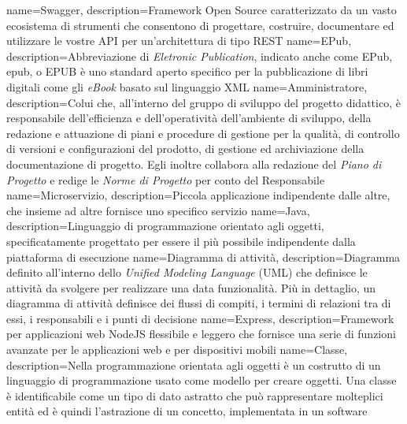  {  
  	name=Swagger,  
  	description={Framework Open Source caratterizzato da un vasto ecosistema di strumenti che consentono di progettare, costruire, documentare ed utilizzare le vostre API per un'architettura di tipo REST}  
}  
 {  
  	name=EPub,   
  	description={Abbreviazione di \textit{Eletronic Publication}, indicato anche come EPub, epub, o EPUB è uno standard aperto specifico per la pubblicazione di libri digitali come gli \textit{eBook} basato sul linguaggio XML}  
}  
 {  
	name=Amministratore,   
	description={Colui che, all'interno del gruppo di sviluppo del progetto didattico, è responsabile dell'efficienza e dell'operatività dell'ambiente di sviluppo, della redazione e attuazione di piani e procedure di gestione per la qualità, di controllo di versioni e configurazioni del prodotto, di gestione ed archiviazione della documentazione di progetto. Egli inoltre collabora alla redazione del \textit{Piano di Progetto} e redige le \textit{Norme di Progetto} per conto del Responsabile}  
}
 {
	name=Microservizio,
	description={Piccola applicazione indipendente dalle altre, che insieme ad altre fornisce uno specifico servizio}
}
 {
	name=Java,
	description={Linguaggio di programmazione orientato agli oggetti, specificatamente progettato per essere il più possibile indipendente dalla piattaforma di esecuzione}
}
 {
	name=Diagramma di attività,
	description={Diagramma definito all'interno dello \textit{Unified Modeling Language} (UML) che definisce le attività da svolgere per realizzare una data funzionalità. Più in dettaglio, un diagramma di attività definisce dei flussi di compiti, i termini di relazioni tra di essi, i responsabili e i punti di decisione}
}
 {
	name=Express,
	description={Framework per applicazioni web NodeJS flessibile e leggero che fornisce una serie di funzioni avanzate per le applicazioni web e per dispositivi mobili}
}
 {
	name=Classe,
	description={Nella programmazione orientata agli oggetti è un costrutto di un linguaggio di programmazione usato come modello per creare oggetti. Una classe è identificabile come un tipo di dato astratto che può rappresentare molteplici entità ed è quindi l'astrazione di un concetto, implementata in un software}
}
